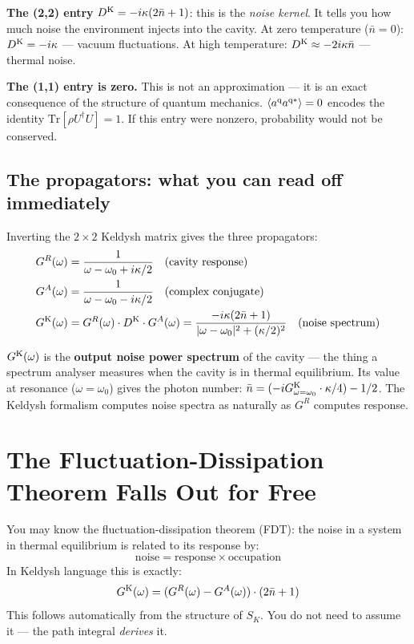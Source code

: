 \documentclass[12pt]{article}
\newcommand{\q}{{\rm q}}
\newcommand{\Keldysh}{{\rm K}}
\newcommand{\av}[1]{\langle #1 \rangle}
\providecommand{\q}{{\rm q}}
\providecommand{\Keldysh}{{\rm K}}
\begin{document}
\textbf{The (2,2) entry} $D^\Keldysh = -i\kappa(2\bar{n}+1)$: this is
the \emph{noise kernel}. It tells you how much noise the environment
injects into the cavity. At zero temperature ($\bar{n}=0$):
$D^\Keldysh = -i\kappa$ --- vacuum fluctuations. At high temperature:
$D^\Keldysh \approx -2i\kappa\bar{n}$ --- thermal noise.

\textbf{The (1,1) entry is zero.} This is not an approximation --- it
is an exact consequence of the structure of quantum mechanics.
$\av{a^\q a^{\q*}} = 0$ encodes the identity $\mathrm{Tr}[\rho U^\dagger U] = 1$.
If this entry were nonzero, probability would not be conserved.

\subsection{The propagators: what you can read off immediately}

Inverting the $2\times 2$ Keldysh matrix gives the three propagators:
\begin{align}
  G^R(\omega) &= \frac{1}{\omega-\omega_0+i\kappa/2}
  \quad\text{(cavity response)} \\
  G^A(\omega) &= \frac{1}{\omega-\omega_0-i\kappa/2}
  \quad\text{(complex conjugate)} \\
  G^\Keldysh(\omega) &= G^R(\omega)\cdot D^\Keldysh\cdot G^A(\omega)
  = \frac{-i\kappa(2\bar{n}+1)}{|\omega-\omega_0|^2+(\kappa/2)^2}
  \quad\text{(noise spectrum)}
\end{align}

\begin{punchline}
$G^\Keldysh(\omega)$ is the \textbf{output noise power spectrum}
of the cavity --- the thing a spectrum analyser measures when
the cavity is in thermal equilibrium. Its value at resonance
($\omega = \omega_0$) gives the photon number:
$\bar{n} = (-iG^\Keldysh_{\omega=\omega_0}\cdot\kappa/4) - 1/2$.
The Keldysh formalism computes noise spectra as naturally as
$G^R$ computes response.
\end{punchline}

\section{The Fluctuation-Dissipation Theorem Falls Out for Free}

You may know the fluctuation-dissipation theorem (FDT): the noise
in a system in thermal equilibrium is related to its response by:
\begin{equation}
  \text{noise} = \text{response} \times \text{occupation}
\end{equation}
In Keldysh language this is exactly:
\begin{equation}
  G^\Keldysh(\omega) = (G^R(\omega) - G^A(\omega))\cdot(2\bar{n}+1)
  \label{eq:FDT_K}
\end{equation}
This follows automatically from the structure of $S_K$. You do not
need to assume it --- the path integral \emph{derives} it.
\end{document}
